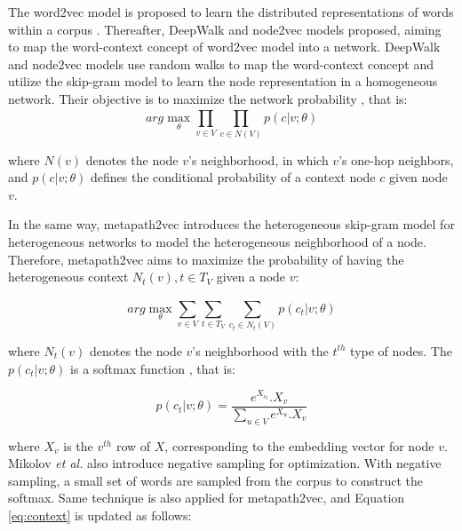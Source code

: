 The word2vec model is proposed to learn the distributed representations of words within a corpus \cite{mikolov2013efficient, mikolov2013distributed}. Thereafter, DeepWalk \cite{perozzi2014deepwalk} and node2vec \cite{grover2016node2vec} models proposed, aiming to map the word-context concept of word2vec model into a network. DeepWalk and node2vec models use random walks to map the word-context concept and utilize the skip-gram model to learn the node representation in a homogeneous network. Their objective is to maximize the network probability \cite{mikolov2013distributed, perozzi2014deepwalk, grover2016node2vec}, that is:
\begin{equation}
    arg \max_{\theta} \prod_{v \in V}^{} \prod_{c \in N(V)}^{} p(c|v;\theta)
\end{equation}

where $N(v)$ denotes the node $v$'s neighborhood, in which $v$'s one-hop neighbors, and $p(c|v;\theta)$ defines the conditional probability of a context node $c$ given node $v$.

In the same way, metapath2vec introduces the heterogeneous skip-gram model for heterogeneous networks to model the heterogeneous neighborhood of a node. Therefore, metapath2vec aims to maximize the probability of having the heterogeneous context $N_{t}(v), t \in T_{V}$ given a node $v$:

\begin{equation}
    arg \max_{\theta} \sum_{v \in V}^{} \sum_{t \in T_{V} }^{} \sum_{c_{t} \in N_{t}(V)}^{} p(c_{t}|v;\theta)
\label{eq:context}
\end{equation}

where $N_{t}(v)$ denotes the node $v$'s neighborhood with the $t^{th}$ type of nodes. The $p(c_{t}|v;\theta)$ is a softmax function \cite{bengio2013representation, mikolov2013distributed}, that is:

\begin{equation}
    p(c_{t}|v;\theta) = \frac{e^{X_{c_{t}}}.X_{v}}{\sum_{u \in V}^{} e^{X_{u}}.X_{v}}
\label{eq:softmax}
\end{equation}

where $X_{v}$ is the $v^{th}$ row of $X$, corresponding to the embedding vector for node $v$. Mikolov \textit{et al.} also introduce negative sampling \cite{mikolov2013distributed} for optimization. With negative sampling, a small set of words are sampled from the corpus to construct the softmax. Same technique is also applied for metapath2vec, and Equation \ref{eq:context} is updated as follows:

